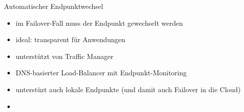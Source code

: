 \begin{flashcard}[Definition]{Automatischer Endpunktwechsel}
  \begin{itemize}
    \item im Failover-Fall muss der Endpunkt gewechselt werden
    \item ideal: transparent für Anwendungen
    \item unterstützt von Traffic Manager
    \item DNS-basierter Load-Balancer mit Endpunkt-Monitoring
    \item unterstüzt auch lokale Endpunkte\newline
    (und damit auch Failover in die Cloud)
  \end{itemize}
\end{flashcard}



\begin{flashcard}[Definition]{}
  \begin{itemize}
    \item 
  \end{itemize}
\end{flashcard}

